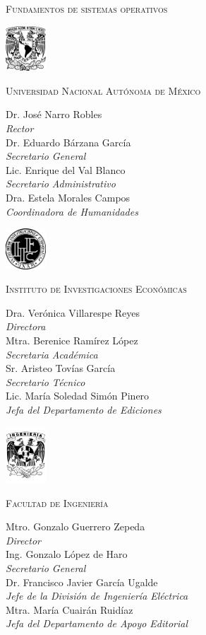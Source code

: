 \pagestyle{empty}
\renewcommand{\thepage}{\arabic{page}}

\textsc{Fundamentos de sistemas operativos}
\eject

\begin{center}
  \includegraphics[width=1.5cm]{unam/logo_unam}

  \textsc{Universidad Nacional Autónoma de México}

  Dr. José Narro Robles\\\textit{Rector}\\
  Dr. Eduardo Bárzana García\\\textit{Secretario General}\\
  Lic. Enrique del Val Blanco\\\textit{Secretario Administrativo}\\
  Dra. Estela Morales Campos\\\textit{Coordinadora de Humanidades}

  \vfill
  \includegraphics[width=1.5cm]{unam/logo_iiec}

  \textsc{Instituto de Investigaciones Económicas}

  Dra. Verónica Villarespe Reyes\\\textit{Directora}\\
  Mtra. Berenice Ramírez López\\\textit{Secretaria Académica}\\
  Sr. Aristeo Tovías García\\\textit{Secretario Técnico}\\
  Lic. María Soledad Simón Pinero\\\textit{Jefa del Departamento de Ediciones}

  \vfill
  \includegraphics[width=1.5cm]{unam/logo_fi}

  \textsc{Facultad de Ingeniería}

  Mtro. Gonzalo Guerrero Zepeda\\\textit{Director}\\
  Ing. Gonzalo López de Haro\\\textit{Secretario General}\\
  Dr. Francisco Javier García Ugalde\\\textit{Jefe de la División de
    Ingeniería Eléctrica}\\
  Mtra. María Cuairán Ruidíaz\\\textit{Jefa del Departamento de Apoyo Editorial}

\end{center}
